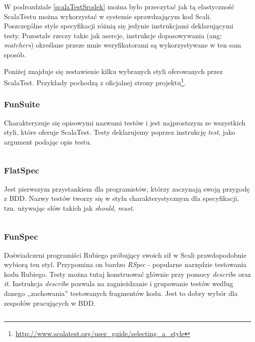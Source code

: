 \documentclass[brudnopis]{xmgr}
\begin{document}
W podrozdziale \ref{scalaTestSrodek} można było przeczytać jak tą elastyczność ScalaTestu można wykorzystać w systemie sprawdzającym kod Scali. Poszczególne style specyfikacji różnią się jedynie instrukcjami deklarującymi testy. Pozostałe rzeczy takie jak asercje, instrukcje dopasowywania (ang: \emph{matchers}) określane przeze mnie weryfikatorami są wykorzystywane w ten sam sposób.

Poniżej znajduje się zestawienie kilku wybranych styli oferowanych przez ScalaTest. Przykłady pochodzą z oficjalnej strony projektu\footnote{\url{http://www.scalatest.org/user_guide/selecting_a_style}}.

\subsubsection{FunSuite}

Charakteryzuje się opisowymi nazwami testów i jest najprostszym ze wszystkich styli, które oferuje ScalaTest. Testy deklarujemy poprzez instrukcję \emph{test}, jako argument podając opis testu.

\inputminted[fontsize=\small]{scala}{code/FunSuite.scala}
 
\subsubsection{FlatSpec}

Jest pierwszym przystankiem dla programistów, którzy zaczynają swoją przygodę z BDD. Nazwy testów tworzy się w stylu charakterystycznym dla specyfikacji, tzn. używając słów takich jak \emph{should}, \emph{must}.

\inputminted[fontsize=\small]{scala}{code/FlatSpec.scala}

\subsubsection{FunSpec}

Doświadczeni programiści Rubiego próbujący swoich sił w Scali prawdopodobnie wybiorą ten styl. Przypomina on bardzo \emph{RSpec} - popularne narzędzie testowania kodu Rubiego. Testy można tutaj konstruować głównie przy pomocy \emph{describe} oraz \emph{it}. Instrukcja \emph{describe} pozwala na zagnieżdzanie i grupowanie testów według danego ,,zachowania'' testowanych fragmentów kodu. Jest to dobry wybór dla zespołów pracujących w BDD.

\inputminted[fontsize=\small]{scala}{code/FunSpec.scala}
\end{document}
